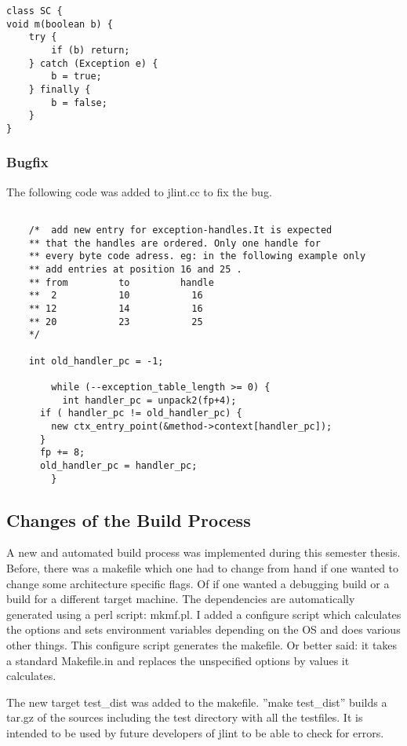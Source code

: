 \documentclass[11pt,twoside,a4paper,draft]{article}
\begin{document}
\begin{verbatim}
class SC {
void m(boolean b) {
    try {
        if (b) return;
    } catch (Exception e) {
        b = true;
    } finally {
        b = false;
    }
}
\end{verbatim}

\subsubsection {Bugfix}

The following code was added to jlint.cc to fix the bug.

\begin{verbatim}

	/*  add new entry for exception-handles.It is expected
	** that the handles are ordered. Only one handle for 
	** every byte code adress. eg: in the following example only 
	** add entries at position 16 and 25 . 
	** from         to         handle
	**  2           10           16
	** 12           14           16
	** 20           23           25
	*/

	int old_handler_pc = -1;

        while (--exception_table_length >= 0) { 
          int handler_pc = unpack2(fp+4);
	  if ( handler_pc != old_handler_pc) {
	    new ctx_entry_point(&method->context[handler_pc]); 
	  }
	  fp += 8;
	  old_handler_pc = handler_pc;
        }

\end{verbatim}


\subsection {Changes of the Build Process}

A new and automated build process was implemented during this semester thesis. Before, there was a makefile which one had to change from hand if one wanted to change some architecture specific flags. Of if one wanted a debugging build or a build for a different target machine. The dependencies are automatically generated using a perl script: mkmf.pl. I added a configure script which calculates the options and sets environment variables depending on the OS and does various other things. This configure script generates the makefile. Or better said: it takes a standard Makefile.in and replaces the unspecified options by values it calculates.

The new target test\_dist was added to the makefile. ''make test\_dist'' builds a tar.gz of the sources including the test directory with all the testfiles. It is intended to be used by future developers of jlint to be able to check for errors.
\end{document}

